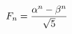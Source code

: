 \documentclass[preview]{standalone}
\begin{document}
\begin{align*}
\special{dvisvgm:raw <g id='unique000'>}F_n=\dfrac{\alpha^n-\beta^n}{\sqrt5}\special{dvisvgm:raw </g>}
\end{align*}
\end{document}
